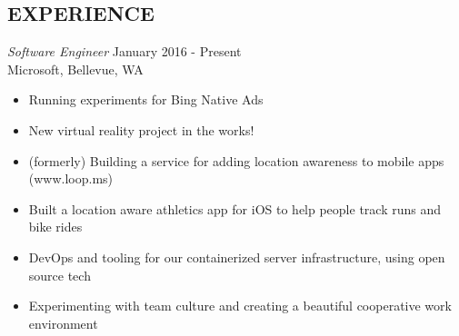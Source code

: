 \documentclass[margin,4pt]{res} %
\begin{document}

\address{
 \\
}


\address{
virajosinha at gmail\\
vsinha.com \\
github.com/vsinha
}





\begin{resume}



 
\section{EXPERIENCE} 
	{\sl Software Engineer} \hfill January 2016 - Present\\
		Microsoft, Bellevue, WA
		\begin{itemize} \itemsep -2pt
		\item Running experiments for Bing Native Ads
		\item New virtual reality project in the works!
		\item (formerly) Building a service for adding location awareness to mobile apps (www.loop.ms)
		\item Built a location aware athletics app for iOS to help people track runs and bike rides
		\item DevOps and tooling for our containerized server infrastructure, using open source tech
		\item Experimenting with team culture and creating a beautiful cooperative work environment
		\end{itemize}


\end{resume}
\end{document}
